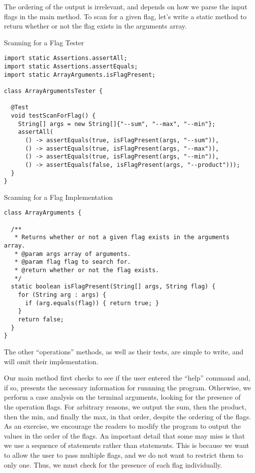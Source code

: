 The ordering of the output is irrelevant, and depends on how we parse the input flags in the main method. To scan for a given flag, let's write a static method to return whether or not the flag exists in the arguments array.

\begin{cl}{Scanning for a Flag Tester} 
\begin{lstlisting}[language=MyJava]
import static Assertions.assertAll;
import static Assertions.assertEquals;
import static ArrayArguments.isFlagPresent;

class ArrayArgumentsTester {

  @Test
  void testScanForFlag() {
    String[] args = new String[]{"--sum", "--max", "--min"};
    assertAll(
      () -> assertEquals(true, isFlagPresent(args, "--sum")),
      () -> assertEquals(true, isFlagPresent(args, "--max")),
      () -> assertEquals(true, isFlagPresent(args, "--min")),
      () -> assertEquals(false, isFlagPresent(args, "--product")));
  }
}
\end{lstlisting}
\end{cl}

\begin{cl}{Scanning for a Flag Implementation}
\begin{lstlisting}[language=MyJava]
class ArrayArguments {

  /**
   * Returns whether or not a given flag exists in the arguments array.
   * @param args array of arguments.
   * @param flag flag to search for.
   * @return whether or not the flag exists.
   */
  static boolean isFlagPresent(String[] args, String flag) {
    for (String arg : args) {
      if (arg.equals(flag)) { return true; }
    }
    return false;
  }
}
\end{lstlisting}
\end{cl}

The other ``operations'' methods, as well as their tests, are simple to write, and will omit their implementation. 

Our main method first checks to see if the user entered the ``help'' command and, if so, presents the necessary information for runnning the program. Otherwise, we perform a case analysis on the terminal arguments, looking for the presence of the operation flags. For arbitrary reasons, we output the sum, then the product, then the min, and finally the max, in that order, despite the ordering of the flags. As an exercise, we encourage the readers to modify the program to output the values in the order of the flags. An important detail that some may miss is that we use a sequence of  statements rather than  statements. This is because we want to allow the user to pass multiple flags, and we do not want to restrict them to only one. Thus, we must check for the presence of each flag individually.

